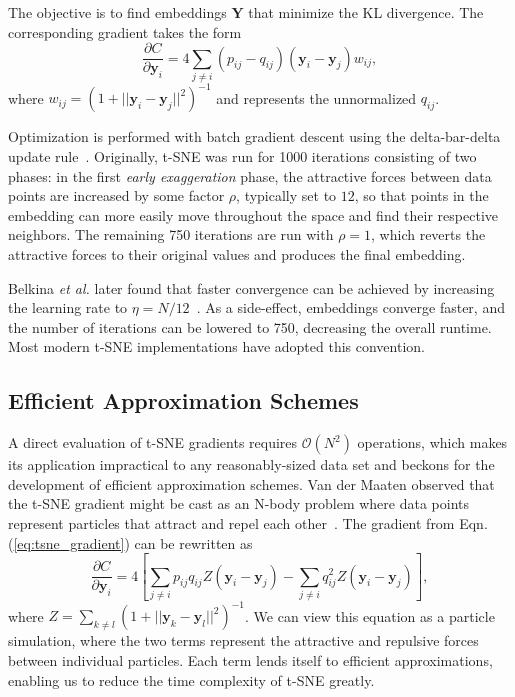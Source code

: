 \documentclass[twocolumn]{bmcart}
\begin{document}
\noindent The objective is to find embeddings $\mathbf{Y}$ that minimize the KL divergence. The corresponding gradient takes the form
\begin{equation}
\frac{\partial C}{\partial \mathbf{y}_i} = 4 \sum_{j \neq i} \left ( p_{ij} - q_{ij} \right ) \left ( \mathbf{y}_i - \mathbf{y}_j \right ) w_{ij},
\label{eq:tsne_gradient}
\end{equation}
where $w_{ij} = \left ( 1 + || \mathbf{y}_i - \mathbf{y}_j || ^2 \right )^{-1}$
and represents the unnormalized $q_{ij}$.

Optimization is performed with batch gradient descent using the delta-bar-delta update rule~\cite{jacobs1988increased}. Originally, t-SNE was run for 1000 iterations consisting of two phases: in the first \textit{early exaggeration} phase, the attractive forces between data points are increased by some factor $\rho$, typically set to $12$, so that points in the embedding can more easily move throughout the space and find their respective neighbors. The remaining 750 iterations are run with $\rho=1$, which reverts the attractive forces to their
original values and produces the final embedding.

Belkina \textit{et al.} later found that faster convergence can be achieved by increasing the learning rate to $\eta=N/12$~\cite{belkina2019automated}. As a side-effect, embeddings converge faster, and the number of iterations can be
lowered to 750, decreasing the overall runtime.  Most modern t-SNE implementations have adopted this convention.

\subsection*{Efficient Approximation Schemes} A direct evaluation of t-SNE gradients requires $\mathcal{O}(N^2)$ operations, which makes its application impractical to any reasonably-sized data set and beckons for the development of efficient approximation schemes. Van der Maaten observed that the t-SNE gradient might be cast as an N-body problem where data points represent particles that attract and repel each other~\cite{van2014accelerating}. The gradient from Eqn. (\ref{eq:tsne_gradient}) can be rewritten as
\begin{equation}
\frac{\partial C}{\partial \mathbf{y}_i} = 4 \left [ \sum_{j \neq i} p_{ij} q_{ij} Z \left ( \mathbf{y}_i - \mathbf{y}_j \right ) -\sum_{j \neq i} q_{ij}^2 Z \left ( \mathbf{y}_i - \mathbf{y}_j \right ) \right ], \label{eq:grad_attr_rep}
\end{equation}
where $Z = \sum_{k \neq l}\left ( 1 + || \mathbf{y}_k - \mathbf{y}_l ||^2 \right
)^{-1}$. We can view this equation as a particle simulation, where the
two terms represent the attractive and repulsive forces between individual
particles. Each term lends itself to efficient approximations, enabling us
to reduce the time complexity of t-SNE greatly.
\end{document}
